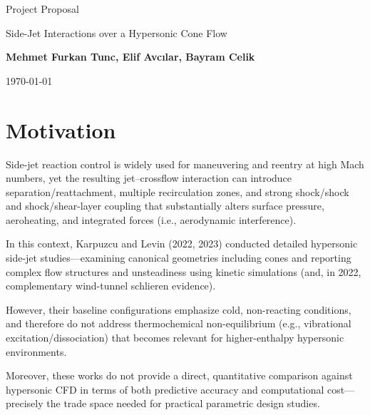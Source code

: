 \documentclass[11pt]{article}
\newcommand{\CourseName}{Project Proposal}
\newcommand{\HWName}{Side-Jet Interactions over a Hypersonic Cone Flow}
\newcommand{\StudentName}{Mehmet Furkan Tunc, Elif Avcılar, Bayram Celik}
\newcommand{\DateSubmitted}{\today}
\begin{document}
\begin{titlepage}
\centering

\vspace*{1.0in}

{\LARGE \CourseName \par}
\vspace{0.15in}
{\Large \HWName \par}

\vspace{0.75in}

{\large \textbf{\StudentName} \par}


\vspace{0.5in}

\vfill

{\large \DateSubmitted \par}

\end{titlepage}

\section{Motivation}
Side-jet reaction control is widely used for maneuvering and reentry at high Mach numbers, yet the resulting jet–crossflow interaction can introduce separation/reattachment, multiple recirculation zones, and strong shock/shock and shock/shear-layer coupling that substantially alters surface pressure, aeroheating, and integrated forces (i.e., aerodynamic interference). 

In this context, Karpuzcu and Levin (2022, 2023) conducted detailed hypersonic side-jet studies—examining canonical geometries including cones and reporting complex flow structures and unsteadiness using kinetic simulations (and, in 2022, complementary wind-tunnel schlieren evidence). 

However, their baseline configurations emphasize cold, non-reacting conditions, and therefore do not address thermochemical non-equilibrium (e.g., vibrational excitation/dissociation) that becomes relevant for higher-enthalpy hypersonic environments. 

Moreover, these works do not provide a direct, quantitative comparison against hypersonic CFD in terms of both predictive accuracy and computational cost—precisely the trade space needed for practical parametric design studies. 
\end{document}
